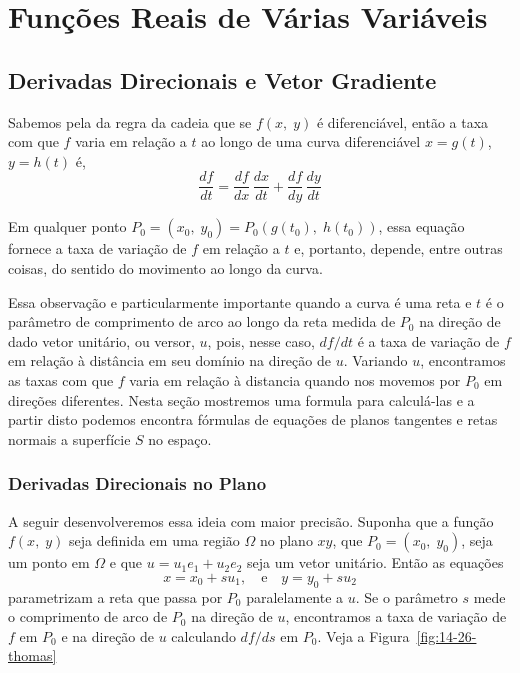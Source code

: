 \chapter{Funções Reais de Várias Variáveis}
\section{Derivadas Direcionais e Vetor Gradiente}
Sabemos pela da regra da cadeia que se \(f(x,\; y)\) é diferenciável, então a taxa com que \(f\) varia em
relação a \(t\) ao longo de uma curva diferenciável \(x=g(t)\), \(y = h(t)\) é,
\begin{equation*}
	\frac{df}{dt}=\frac{df}{dx}\,\frac{dx}{dt}+\frac{df}{dy}\,\frac{dy}{dt}
\end{equation*}

Em qualquer ponto \(P_{0}= (x_{0},\;y_{0}) = P_{0}(g(t_{0}),\; h(t_{0}))\), essa equação fornece a taxa de variação de \(f\) em relação a \(t\) e, portanto, depende, entre outras coisas, do sentido do movimento ao longo da curva.

Essa observação e particularmente importante quando a curva é uma reta e \(t\) é o parâmetro de comprimento de arco
ao longo da reta medida de \(P_{0}\) na direção de dado vetor unitário, ou versor, \(u\), pois, nesse caso, \(df/dt\) é a taxa de variação de \(f\) em relação à distância em seu domínio na direção de \(u\). Variando \(u\), encontramos as taxas com que \(f\) varia em relação à distancia quando nos movemos por \(P_{0}\) em direções diferentes. Nesta seção mostremos uma formula para calculá-las e a partir disto podemos encontra fórmulas de equações de planos tangentes e retas normais a superfície $S$ no espaço.

%
\subsection{Derivadas Direcionais no Plano}
%

A seguir desenvolveremos  essa ideia com maior precisão. Suponha que a função \(f(x,\; y)\) seja definida em uma
região \(\Omega\) no plano \(xy\), que \(P_{0}=(x_{0},\; y_{0})\), seja um ponto em \(\Omega\) e que \(u = u_{1}e_{1}
+ u_{2}e_{2}\)  seja um vetor unitário. Então as equações
\begin{equation*}
	x = x_{0}+su_{1}, \quad \text{e}\quad y=y_{0}+su_{2}
\end{equation*}
parametrizam a reta que passa por \(P_{0}\) paralelamente a \(u\). Se o parâmetro \(s\) mede o comprimento de arco de
\(P_{0}\) na direção de \(u\), encontramos a taxa de variação de \(f\) em \(P_{0}\) e na direção de \(u\) calculando
\(df/ds\) em \(P_{0}\).  Veja a Figura~\ref{fig:14-26-thomas}

